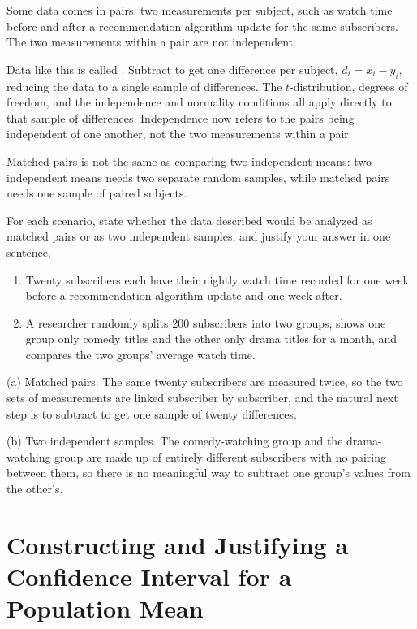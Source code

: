 Some data comes in pairs: two measurements per subject, such as watch time before and after a recommendation-algorithm update for the same subscribers. The two measurements within a pair are not independent.

Data like this is called . Subtract to get one difference per subject, $d_i = x_i - y_i$, reducing the data to a single sample of differences. The $t$-distribution, degrees of freedom, and the independence and normality conditions all apply directly to that sample of differences. Independence now refers to the pairs being independent of one another, not the two measurements within a pair.

Matched pairs is not the same as comparing two independent means: two independent means needs two separate random samples, while matched pairs needs one sample of paired subjects.

\begin{Exercise}[title={Paired or Independent?}, label={ex:means-paired-classify}]
For each scenario, state whether the data described would be analyzed as matched pairs or as two independent samples, and justify your answer in one sentence.
\begin{enumerate}
    \item[(a)] Twenty subscribers each have their nightly watch time recorded for one week before a recommendation algorithm update and one week after.
    \item[(b)] A researcher randomly splits 200 subscribers into two groups, shows one group only comedy titles and the other only drama titles for a month, and compares the two groups' average watch time.
\end{enumerate}
\end{Exercise}

\begin{Answer}[ref={ex:means-paired-classify}]
(a) Matched pairs. The same twenty subscribers are measured twice, so the two sets of measurements are linked subscriber by subscriber, and the natural next step is to subtract to get one sample of twenty differences.

(b) Two independent samples. The comedy-watching group and the drama-watching group are made up of entirely different subscribers with no pairing between them, so there is no meaningful way to subtract one group's values from the other's.
\end{Answer}

\section{Constructing and Justifying a Confidence Interval for a Population Mean}
 
